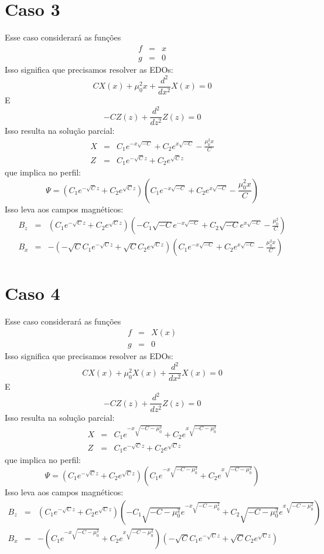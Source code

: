 \documentclass[12pt]{article}
\def\be{\begin{equation}}
\def\ee{\end{equation}}
\def\bea{\begin{eqnarray*}}
\def\eea{\end{eqnarray*}}
\theoremstyle{definition}
\numberwithin{equation}{section}
\begin{document}
        \section{Caso 3}
        Esse caso considerará as funções
        \bea
            f &=& x \\
            g &=& 0
        \eea
        Isso significa que precisamos resolver as EDOs:
        \be
            C X{\left(x \right)} + \mu_{0}^{2} x + \frac{d^{2}}{d x^{2}} X{\left(x \right)} = 0
        \ee
        E
        \be
            - C Z{\left(z \right)} + \frac{d^{2}}{d z^{2}} Z{\left(z \right)} = 0
        \ee
        Isso resulta na solução parcial:
        \bea
            X &=& C_{1} e^{- x \sqrt{- C}} + C_{2} e^{x \sqrt{- C}} - \frac{\mu_{0}^{2} x}{C} \\
            Z &=& C_{1} e^{- \sqrt{C} z} + C_{2} e^{\sqrt{C} z}
        \eea
        que implica no perfil:
        \be
            \Psi = \left(C_{1} e^{- \sqrt{C} z} + C_{2} e^{\sqrt{C} z}\right) \left(C_{1} e^{- x \sqrt{- C}} + C_{2} e^{x \sqrt{- C}} - \frac{\mu_{0}^{2} x}{C}\right)
        \ee
        Isso leva aos campos magnéticos:
        \bea
            B_z &=& \left(C_{1} e^{- \sqrt{C} z} + C_{2} e^{\sqrt{C} z}\right) \left(- C_{1} \sqrt{- C} e^{- x \sqrt{- C}} + C_{2} \sqrt{- C} e^{x \sqrt{- C}} - \frac{\mu_{0}^{2}}{C}\right)\\
            B_x &=& - \left(- \sqrt{C} C_{1} e^{- \sqrt{C} z} + \sqrt{C} C_{2} e^{\sqrt{C} z}\right) \left(C_{1} e^{- x \sqrt{- C}} + C_{2} e^{x \sqrt{- C}} - \frac{\mu_{0}^{2} x}{C}\right)
        \eea
        

        \section{Caso 4}
        Esse caso considerará as funções
        \bea
            f &=& X{\left(x \right)} \\
            g &=& 0
        \eea
        Isso significa que precisamos resolver as EDOs:
        \be
            C X{\left(x \right)} + \mu_{0}^{2} X{\left(x \right)} + \frac{d^{2}}{d x^{2}} X{\left(x \right)} = 0
        \ee
        E
        \be
            - C Z{\left(z \right)} + \frac{d^{2}}{d z^{2}} Z{\left(z \right)} = 0
        \ee
        Isso resulta na solução parcial:
        \bea
            X &=& C_{1} e^{- x \sqrt{- C - \mu_{0}^{2}}} + C_{2} e^{x \sqrt{- C - \mu_{0}^{2}}} \\
            Z &=& C_{1} e^{- \sqrt{C} z} + C_{2} e^{\sqrt{C} z}
        \eea
        que implica no perfil:
        \be
            \Psi = \left(C_{1} e^{- \sqrt{C} z} + C_{2} e^{\sqrt{C} z}\right) \left(C_{1} e^{- x \sqrt{- C - \mu_{0}^{2}}} + C_{2} e^{x \sqrt{- C - \mu_{0}^{2}}}\right)
        \ee
        Isso leva aos campos magnéticos:
        \bea
            B_z &=& \left(C_{1} e^{- \sqrt{C} z} + C_{2} e^{\sqrt{C} z}\right) \left(- C_{1} \sqrt{- C - \mu_{0}^{2}} e^{- x \sqrt{- C - \mu_{0}^{2}}} + C_{2} \sqrt{- C - \mu_{0}^{2}} e^{x \sqrt{- C - \mu_{0}^{2}}}\right)\\
            B_x &=& - \left(C_{1} e^{- x \sqrt{- C - \mu_{0}^{2}}} + C_{2} e^{x \sqrt{- C - \mu_{0}^{2}}}\right) \left(- \sqrt{C} C_{1} e^{- \sqrt{C} z} + \sqrt{C} C_{2} e^{\sqrt{C} z}\right)
        \eea
        
\end{document}
